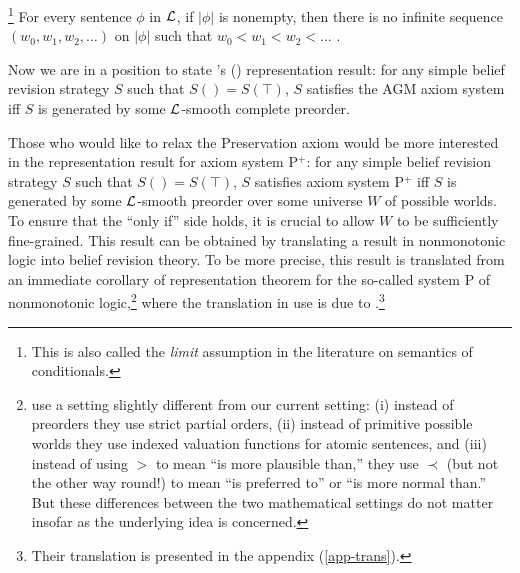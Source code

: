 	\footnote
		{
		This is also called the {\em limit} assumption in the literature on semantics of conditionals. 
		}
	For every sentence $\phi$ in ${\cal L}$, if $|\phi|$ is nonempty, then there is no infinite sequence $(w_0, w_1, w_2, \dots)$ on $|\phi|$ such that $w_0 < w_1 < w_2 < \ldots$ .

\ed %



Now we are in a position to state \citeauthor{grove1988two}'s () representation result: for any simple belief revision strategy $S$ such that $S() = S(\top)$, $S$ satisfies the AGM axiom system iff $S$ is generated by some ${\cal L}$-smooth complete preorder.

Those who would like to relax the Preservation axiom would be more interested in the representation result for axiom system P$^+$: for any simple belief revision strategy $S$ such that $S() = S(\top)$, $S$ satisfies axiom system P$^+$ iff $S$ is generated by some ${\cal L}$-smooth preorder over some universe $W$ of possible worlds. To ensure that the ``only if'' side holds, it is crucial to allow $W$ to be sufficiently fine-grained. This result can be obtained by translating a result in nonmonotonic logic into belief revision theory. To be more precise, this result is translated
from an immediate corollary of  representation theorem for the so-called system P of nonmonotonic logic,\footnote
	{
	\citet*{kraus1990nonmonotonic} use a setting slightly different from our current setting: (i) instead of preorders they use strict partial orders, (ii) instead of primitive possible worlds they use indexed valuation functions for atomic sentences, and (iii) instead of using $>$ to mean ``is more plausible than,'' they use $\prec$ (but not the other way round!) to mean ``is preferred to'' or ``is more normal than.'' But these differences between the two mathematical settings do not matter insofar as the underlying idea is concerned.
	}
where the translation in use is due to \citet*{makinson1991relations}.\footnote 
	{
	Their translation is presented in the appendix (\autoref{app-trans}).
	}

